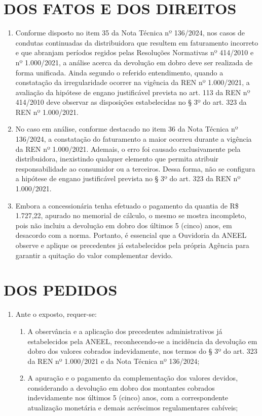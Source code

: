 \newcommand{\tipoRequerimento}{Contestação do memorial de cálculo, pagamento complementar do dobro}

\section{DOS FATOS E DOS DIREITOS}

\begin{enumerate}[resume]
\item Conforme disposto no item 35 da Nota Técnica nº 136/2024, nos casos de condutas continuadas da distribuidora que resultem em faturamento incorreto e que abranjam períodos regidos pelas Resoluções Normativas nº 414/2010 e nº 1.000/2021, a análise acerca da devolução em dobro deve ser realizada de forma unificada. Ainda segundo o referido entendimento, quando a constatação da irregularidade ocorrer na vigência da REN nº 1.000/2021, a avaliação da hipótese de engano justificável prevista no art. 113 da REN nº 414/2010 deve observar as disposições estabelecidas no § 3º do art. 323 da REN nº 1.000/2021.
\item No caso em análise, conforme destacado no item 36 da Nota Técnica nº 136/2024, a constatação do faturamento a maior ocorreu durante a vigência da REN nº 1.000/2021. Ademais, o erro foi causado exclusivamente pela distribuidora, inexistindo qualquer elemento que permita atribuir responsabilidade ao consumidor ou a terceiros. Dessa forma, não se configura a hipótese de engano justificável prevista no § 3º do art. 323 da REN nº 1.000/2021. 
\item Embora a concessionária tenha efetuado o pagamento da quantia de  R\$ 1.727,22, apurado no memorial de cálculo, o mesmo se mostra incompleto, pois não incluiu a devolução em dobro dos últimos 5 (cinco) anos, em desacordo com a norma. Portanto, é essencial que a Ouvidoria da ANEEL observe e aplique os precedentes já estabelecidos pela própria Agência para garantir a quitação do valor complementar devido.
\end{enumerate}

\section{DOS PEDIDOS}

\begin{enumerate}[resume]
\item Ante o exposto, requer-se:
    \begin{enumerate}
    \item A observância e a aplicação dos precedentes administrativos já estabelecidos pela ANEEL, reconhecendo-se a incidência da devolução em dobro dos valores cobrados indevidamente, nos termos do § 3º do art. 323 da REN nº 1.000/2021 e da Nota Técnica nº 136/2024;
    \item A apuração e o pagamento da complementação dos valores devidos, considerando a devolução em dobro dos montantes cobrados indevidamente nos últimos 5 (cinco) anos, com a correspondente atualização monetária e demais acréscimos regulamentares cabíveis;

    \end{enumerate}
\end{enumerate}
